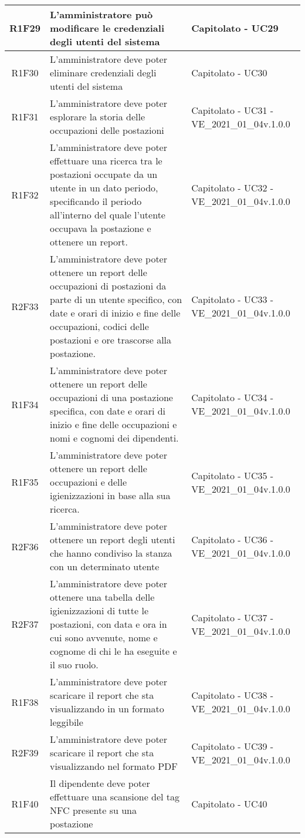 \begin{center}
\begin{longtable}{|c|p{10cm}|p{4cm}|}
		\hline
		R1F29&L'amministratore può modificare le credenziali degli utenti del sistema	&Capitolato - UC29	\\
		\hline
		R1F30&L'amministratore deve poter eliminare credenziali degli utenti del sistema	& Capitolato - UC30	\\
		\hline	
		R1F31&L'amministratore deve poter esplorare la storia delle occupazioni delle postazioni	& Capitolato - UC31 - VE\_2021\_01\_04v.1.0.0	\\
		\hline
		R1F32&L'amministratore deve poter effettuare una ricerca tra le postazioni occupate da un utente in un dato periodo, specificando il periodo all'interno del quale l'utente occupava la postazione e ottenere un report. & 	Capitolato - UC32 - VE\_2021\_01\_04v.1.0.0\\
		\hline
		R2F33&L'amministratore deve poter ottenere un report delle occupazioni di postazioni da parte di un utente specifico, con date e orari di inizio e fine delle occupazioni,  codici delle postazioni e ore trascorse alla postazione. & 	Capitolato - UC33 - VE\_2021\_01\_04v.1.0.0\\
		\hline
		R1F34&L'amministratore deve poter ottenere un report delle occupazioni di una postazione specifica, con date e orari di inizio e fine delle occupazioni e nomi e cognomi dei dipendenti.	&Capitolato - UC34 - VE\_2021\_01\_04v.1.0.0	\\
		\hline
		R1F35&L'amministratore deve poter ottenere un report delle occupazioni e delle igienizzazioni in base alla sua ricerca.	&Capitolato - UC35 - VE\_2021\_01\_04v.1.0.0	\\
		\hline
		R2F36 & L'amministratore deve poter ottenere un report degli utenti che hanno condiviso la stanza con un determinato utente & Capitolato - UC36 - VE\_2021\_01\_04v.1.0.0\\
		\hline
		R2F37&L'amministratore deve poter ottenere una tabella delle igienizzazioni di tutte le postazioni, con data e ora in cui sono avvenute, nome e cognome di chi le ha eseguite e il suo ruolo.	&Capitolato - UC37 - VE\_2021\_01\_04v.1.0.0	\\
		\hline
		R1F38 & L'amministratore deve poter scaricare il report che sta visualizzando in un formato leggibile & Capitolato - UC38 - VE\_2021\_01\_04v.1.0.0\\
		\hline	
		R2F39 & L'amministratore deve poter scaricare il report che sta visualizzando nel formato PDF & Capitolato - UC39 - VE\_2021\_01\_04v.1.0.0\\
		\hline		 
		R1F40 & Il dipendente deve poter effettuare una scansione del tag NFC presente su una postazione & Capitolato - UC40 \\

\end{longtable}
\end{center}
